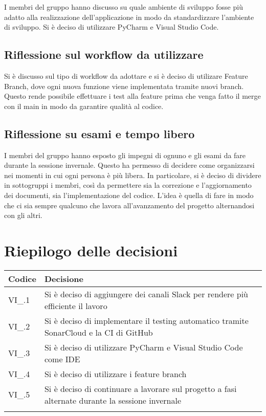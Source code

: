 I membri del gruppo hanno discusso su quale ambiente di sviluppo fosse più adatto alla realizzazione dell'applicazione in modo da standardizzare l'ambiente di sviluppo. Si è deciso di utilizzare PyCharm e Visual Studio Code.

\subsection{Riflessione sul workflow da utilizzare}

Si è discusso sul tipo di workflow da adottare e si è deciso di utilizare Feature Branch, dove ogni nuova funzione viene implementata tramite nuovi branch. Questo rende possibile effettuare i test alla feature prima che venga fatto il merge con il main in modo da garantire qualità al codice.

\subsection{Riflessione su esami e tempo libero}

I membri del gruppo hanno esposto gli impegni di ognuno e gli esami da fare durante la sessione invernale. Questo ha permesso di decidere come organizzarsi nei momenti in cui ogni persona è più libera. In particolare, si è deciso di dividere in sottogruppi i membri, così da permettere sia la correzione e l'aggiornamento dei documenti, sia l'implementazione del codice. L'idea è quella di fare in modo che ci sia sempre qualcuno che lavora all'avanzamento del progetto alternandosi con gli altri.

\newpage

\section{Riepilogo delle decisioni \hfil}
{
	\setlength{\freewidth}{\dimexpr\textwidth-4\tabcolsep}
	\renewcommand{\arraystretch}{1.5}
	\setlength{\aboverulesep}{0pt}
	\setlength{\belowrulesep}{0pt}
	\begin{longtable}{L{.3\freewidth} L{.7\freewidth}}
		\toprule 
		\textbf{Codice} & \textbf{Decisione}\\
		\toprule
		\endhead
		
		VI\_\DataMeeting{}.1 & Si è deciso di aggiungere dei canali Slack per rendere più efficiente il lavoro\\
		VI\_\DataMeeting{}.2 & Si è deciso di implementare il testing automatico tramite SonarCloud e la CI di GitHub\\
		VI\_\DataMeeting{}.3 & Si è deciso di utilizzare PyCharm e Visual Studio Code come IDE\\
		VI\_\DataMeeting{}.4 & Si è deciso di utilizzare i feature branch \\
		VI\_\DataMeeting{}.5 & Si è deciso di continuare a lavorare sul progetto a fasi alternate durante la sessione invernale\\
		
		\bottomrule
		\hiderowcolors
	\end{longtable}
}